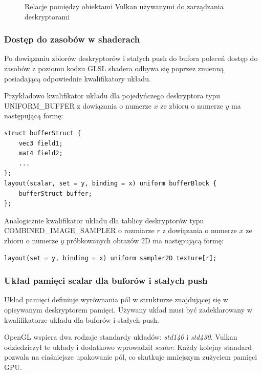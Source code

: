 \begin{figure}[H]
	\caption{Relacje pomiędzy obiektami Vulkan używanymi do zarządzania deskryptorami}
	\label{descriptor_relations}
\end{figure}

\subsubsection{Dostęp do zasobów w shaderach}

Po dowiązaniu zbiorów deskryptorów i stałych push do bufora poleceń dostęp do zasobów z poziomu kodzu GLSL shadera odbywa się poprzez zmienną posiadającą odpowiednie kwalifikatory układu.

Przykładowo kwalifikator układu dla pojedyńczego deskryptora typu UNIFORM\_BUFFER z dowiązania o numerze $x$ ze zbioru o numerze $y$ ma następującą formę:
\lstset{language=GLSL}
\begin{lstlisting}
struct bufferStruct {
	vec3 field1;
	mat4 field2;
	...
};
layout(scalar, set = y, binding = x) uniform bufferBlock {
	bufferStruct buffer;
};
\end{lstlisting}

Analogicznie kwalifikator układu dla tablicy deskryptorów typu COMBINED\_IMAGE\_SAMPLER o rozmiarze $r$ z dowiązania o numerze $x$ ze zbioru o numerze $y$ próbkowanych obrazów 2D ma następującą formę:
\lstset{language=GLSL}
\begin{lstlisting}
layout(set = y, binding = x) uniform sampler2D texture[r];
\end{lstlisting}


\subsubsection{Układ pamięci scalar dla buforów i stałych push}

Układ pamięci definiuje wyrównania pól w strukturze znajdującej się w opisywanym deskryptorem pamięci.
Używany układ musi być zadeklarowany w kwalifikatorze układu dla buforów i stałych push.

OpenGL wspiera dwa rodzaje standardy układów: \textit{std140} i \textit{std430}.
Vulkan odziedziczył te układy i dodatkowo wprowadził \textit{scalar}.
Każdy kolejny standard pozwala na ciaśniejsze upakowanie pól, co skutkuje mniejszym zużyciem pamięci GPU.


